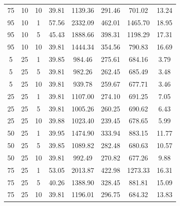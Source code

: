 \begin{table}[H]
\begin{tabular}{ccc|c|c|c|c|c}
75 & 10 & 10 & \cellcolor{gray!80}39.81 & \cellcolor{gray!11}1139.36 & \cellcolor{gray!1}291.46 & \cellcolor{gray!68}701.02 & 13.24\\
95 & 10 & 1 & \cellcolor{gray!1}57.56 & \cellcolor{gray!1}2332.09 & \cellcolor{gray!1}462.01 & \cellcolor{gray!1}1465.70 & 18.95\\
95 & 10 & 5 & \cellcolor{gray!24}45.43 & \cellcolor{gray!1}1888.66 & \cellcolor{gray!1}398.31 & \cellcolor{gray!1}1198.29 & 17.31\\
95 & 10 & 10 & \cellcolor{gray!80}39.81 & \cellcolor{gray!1}1444.34 & \cellcolor{gray!1}354.56 & \cellcolor{gray!40}790.83 & 16.69\\
5 & 25 & 1 & \cellcolor{gray!80}39.85 & \cellcolor{gray!37}984.46 & \cellcolor{gray!1}275.61 & \cellcolor{gray!73}684.16 & 3.79\\
5 & 25 & 5 & \cellcolor{gray!80}39.81 & \cellcolor{gray!38}982.26 & \cellcolor{gray!1}262.45 & \cellcolor{gray!73}685.49 & 3.48\\
5 & 25 & 10 & \cellcolor{gray!80}39.81 & \cellcolor{gray!45}939.78 & \cellcolor{gray!3}259.67 & \cellcolor{gray!75}677.71 & 3.46\\
25 & 25 & 1 & \cellcolor{gray!80}39.81 & \cellcolor{gray!17}1107.00 & \cellcolor{gray!1}274.10 & \cellcolor{gray!71}691.25 & 7.05\\
25 & 25 & 5 & \cellcolor{gray!80}39.81 & \cellcolor{gray!34}1005.26 & \cellcolor{gray!2}260.25 & \cellcolor{gray!71}690.62 & 6.43\\
25 & 25 & 10 & \cellcolor{gray!80}39.88 & \cellcolor{gray!31}1023.40 & \cellcolor{gray!22}239.45 & \cellcolor{gray!75}678.65 & 5.99\\
50 & 25 & 1 & \cellcolor{gray!79}39.95 & \cellcolor{gray!1}1474.90 & \cellcolor{gray!1}333.94 & \cellcolor{gray!12}883.15 & 11.77\\
50 & 25 & 5 & \cellcolor{gray!80}39.85 & \cellcolor{gray!20}1089.82 & \cellcolor{gray!1}282.48 & \cellcolor{gray!74}680.63 & 10.57\\
50 & 25 & 10 & \cellcolor{gray!80}39.81 & \cellcolor{gray!36}992.49 & \cellcolor{gray!1}270.82 & \cellcolor{gray!75}677.26 & 9.88\\
75 & 25 & 1 & \cellcolor{gray!1}53.05 & \cellcolor{gray!1}2013.87 & \cellcolor{gray!1}422.98 & \cellcolor{gray!1}1273.33 & 16.31\\
75 & 25 & 5 & \cellcolor{gray!76}40.26 & \cellcolor{gray!1}1388.90 & \cellcolor{gray!1}328.45 & \cellcolor{gray!12}881.81 & 15.09\\
75 & 25 & 10 & \cellcolor{gray!80}39.81 & \cellcolor{gray!2}1196.01 & \cellcolor{gray!1}296.75 & \cellcolor{gray!73}684.32 & 13.83\\

\end{tabular}
\end{table}
